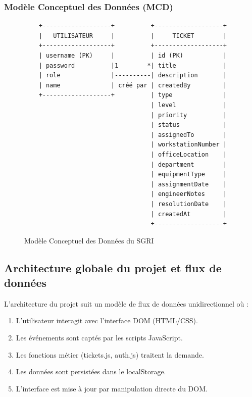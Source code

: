 \documentclass[12pt,a4paper,twoside]{report}
\begin{document}
\subsubsection{Modèle Conceptuel des Données (MCD)}

\begin{figure}[H]
    \centering
    \caption{Modèle Conceptuel des Données du SGRI}
    \label{fig:mcd}
    \begin{verbatim}
    +-------------------+          +-------------------+
    |   UTILISATEUR     |          |     TICKET        |
    +-------------------+          +-------------------+
    | username (PK)     |          | id (PK)           |
    | password          |1        *| title             |
    | role              |----------| description       |
    | name              | créé par | createdBy         |
    +-------------------+          | type              |
                                   | level             |
                                   | priority          |
                                   | status            |
                                   | assignedTo        |
                                   | workstationNumber |
                                   | officeLocation    |
                                   | department        |
                                   | equipmentType     |
                                   | assignmentDate    |
                                   | engineerNotes     |
                                   | resolutionDate    |
                                   | createdAt         |
                                   +-------------------+
    \end{verbatim}
\end{figure}

\subsection{Architecture globale du projet et flux de données}

L'architecture du projet suit un modèle de flux de données unidirectionnel où :

\begin{enumerate}
    \item L'utilisateur interagit avec l'interface DOM (HTML/CSS).
    \item Les événements sont captés par les scripts JavaScript.
    \item Les fonctions métier (tickets.js, auth.js) traitent la demande.
    \item Les données sont persistées dans le localStorage.
    \item L'interface est mise à jour par manipulation directe du DOM.
\end{enumerate}
\end{document}
